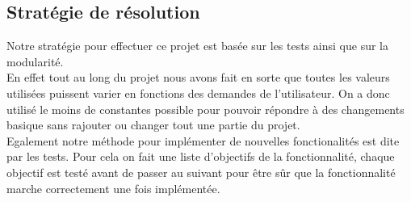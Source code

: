 \subsection{Stratégie de résolution}

    Notre stratégie pour effectuer ce projet est basée sur les tests ainsi que sur la modularité. \\
    En effet tout au long du projet nous avons fait  en sorte que toutes les valeurs utilisées puissent varier en fonctions des demandes de l'utilisateur. On a donc utilisé le moins de constantes possible pour pouvoir répondre à des changements basique sans rajouter ou changer tout une partie du projet. \\
    Egalement notre méthode pour implémenter de nouvelles fonctionalités est dite par les tests. Pour cela on fait une liste d'objectifs de la fonctionnalité, chaque objectif est testé avant de passer au suivant pour être sûr que la fonctionnalité marche correctement une fois implémentée.